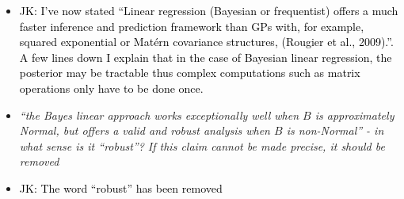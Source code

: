 \documentclass[12pt]{article}
\newcommand{\done}[2]{\item[#1]\textit{#2}}
\newcommand{\jack}[1]{\item{\textcolor{black}{JK: #1}}}
\begin{document}
\begin{itemize}
\jack{I've now stated ``Linear regression (Bayesian or frequentist) offers a much faster inference and prediction framework than GPs with, for example, squared exponential or Mat\'ern covariance structures, (Rougier et al., 2009).''. A few lines down I explain that in the case of Bayesian linear regression, the posterior may be tractable thus complex computations such as matrix operations only have to be done once.}

\done{P60}{``the Bayes linear approach works exceptionally well when $B$ is approximately Normal, but offers a valid and robust analysis when $B$ is non-Normal'' - in what sense is it ``robust''?  If this claim cannot be made precise, it should be removed}

\jack{The word ``robust'' has been removed}
\end{itemize}


\newpage
\end{document}
